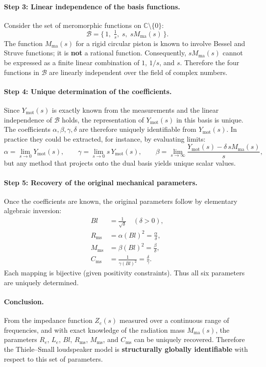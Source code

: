 \paragraph{Step 3: Linear independence of the basis functions.}
Consider the set of meromorphic functions on $\mathbb{C}\setminus\{0\}$:
\[
\mathcal{B} = \{\,1,\; \tfrac{1}{s},\; s,\; s M_{\mathrm{ma}}(s)\,\}.
\]
The function $M_{\mathrm{ma}}(s)$ for a rigid circular piston is known to involve Bessel and Struve functions; it is \textbf{not} a rational function. Consequently, $s M_{\mathrm{ma}}(s)$ cannot be expressed as a finite linear combination of $1$, $1/s$, and $s$. Therefore the four functions in $\mathcal{B}$ are linearly independent over the field of complex numbers.

\paragraph{Step 4: Unique determination of the coefficients.}
Since $Y_{\mathrm{mot}}(s)$ is exactly known from the measurements and the linear independence of $\mathcal{B}$ holds, the representation of $Y_{\mathrm{mot}}(s)$ in this basis is unique. The coefficients $\alpha,\beta,\gamma,\delta$ are therefore uniquely identifiable from $Y_{\mathrm{mot}}(s)$. In practice they could be extracted, for instance, by evaluating limits:
\[
\alpha = \lim_{s\to 0} Y_{\mathrm{mot}}(s),\qquad
\gamma = \lim_{s\to 0} s\, Y_{\mathrm{mot}}(s),\qquad
\beta  = \lim_{s\to\infty} \frac{Y_{\mathrm{mot}}(s) - \delta\, s M_{\mathrm{ma}}(s)}{s},
\]
but any method that projects onto the dual basis yields unique scalar values.

\paragraph{Step 5: Recovery of the original mechanical parameters.}
Once the coefficients are known, the original parameters follow by elementary algebraic inversion:
\begin{align*}
Bl      &= \frac{1}{\sqrt{\delta}} \quad (\delta > 0), \\
R_{\mathrm{ms}} &= \alpha (Bl)^2 = \frac{\alpha}{\delta}, \\
M_{\mathrm{ms}} &= \beta (Bl)^2 = \frac{\beta}{\delta}, \\
C_{\mathrm{ms}} &= \frac{1}{\gamma (Bl)^2} = \frac{\delta}{\gamma}.
\end{align*}
Each mapping is bijective (given positivity constraints). Thus all six parameters are uniquely determined.

\paragraph{Conclusion.}
From the impedance function $Z_e(s)$ measured over a continuous range of frequencies, and with exact knowledge of the radiation mass $M_{\mathrm{ma}}(s)$, the parameters $R_e$, $L_e$, $Bl$, $R_{\mathrm{ms}}$, $M_{\mathrm{ms}}$, and $C_{\mathrm{ms}}$ can be uniquely recovered. Therefore the Thiele--Small loudspeaker model is \textbf{structurally globally identifiable} with respect to this set of parameters.

